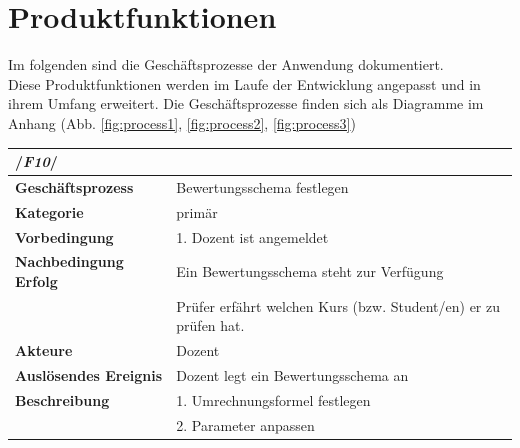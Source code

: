 	\section{Produktfunktionen\label{chap:Prfunk}}
	Im folgenden sind die Geschäftsprozesse der Anwendung dokumentiert.\\
	Diese Produktfunktionen werden im Laufe der Entwicklung angepasst und in ihrem Umfang erweitert.
	Die Geschäftsprozesse finden sich als Diagramme im Anhang (Abb. \ref{fig:process1}, \ref{fig:process2}, \ref{fig:process3})
	
		\begin{table}[H]
			\begin{tabular}{ll}
				\multicolumn{2}{l}{/\textbf{\textit{F10}}/}\\\hline
				 \textbf{Geschäftsprozess} & Bewertungsschema festlegen \\ 
				 \textbf{Kategorie} & primär \\ 
				 \textbf{Vorbedingung} & 1. Dozent ist angemeldet  \\ 
				 \textbf{Nachbedingung Erfolg\phantom{xxxx}} & Ein Bewertungsschema steht zur Verfügung\\ 
				 & Prüfer erfährt welchen Kurs (bzw.  Student/en) er zu prüfen hat.\\
				 \textbf{Akteure} & Dozent \\ 
				 \textbf{Auslösendes Ereignis} & Dozent legt ein Bewertungsschema an  \\ 
				 \textbf{Beschreibung} &  1. Umrechnungsformel festlegen\\
				 & 2. Parameter anpassen
				 \end{tabular} 
			\label{tab:F10}
			\end{table}
	
